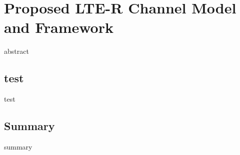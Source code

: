 \chapter{Proposed LTE-R Channel Model and Framework}
\label{chapter4}

abstract

\section{test}
test

\section{Summary}
summary

